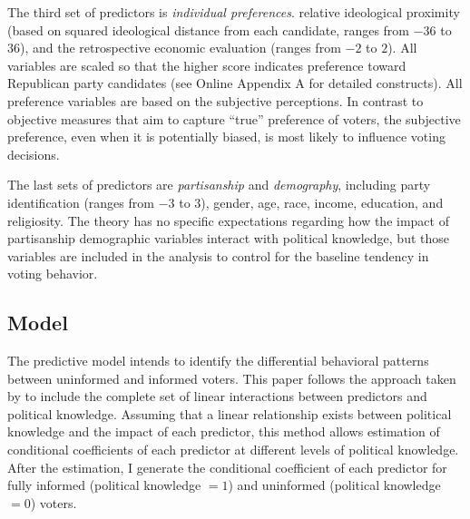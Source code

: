 \documentclass[letterpaper, 12pt]{article}
\begin{document}
    \par The third set of predictors is \textit{individual preferences}. relative ideological proximity (based on squared ideological distance from each candidate, ranges from $-36$ to $36$), and the retrospective economic evaluation (ranges from $-2$ to $2$). All variables are scaled so that the higher score indicates preference toward Republican party candidates (see Online Appendix A for detailed constructs). All preference variables are based on the subjective perceptions. In contrast to objective measures that aim to capture ``true'' preference of voters, the subjective preference, even when it is potentially biased, is most likely to influence voting decisions. 

    \par The last sets of predictors are \textit{partisanship} and \textit{demography}, including party identification (ranges from $-3$ to $3$), gender, age, race, income, education, and religiosity. The theory has no specific expectations regarding how the impact of partisanship demographic variables interact with political knowledge, but those variables are included in the analysis to control for the baseline tendency in voting behavior. 
    
    \subsection*{Model}

    \par The predictive model intends to identify the differential behavioral patterns between uninformed and informed voters. This paper follows the approach taken by \cite{Bartels1996unvo} to include the complete set of linear interactions between predictors and political knowledge. 
    Assuming that a linear relationship exists between political knowledge and the impact of each predictor, this method allows estimation of conditional coefficients of each predictor at different levels of political knowledge. After the estimation, I generate the conditional coefficient of each predictor for fully informed (political knowledge $= 1$) and uninformed (political knowledge $=0$) voters.
\end{document}

